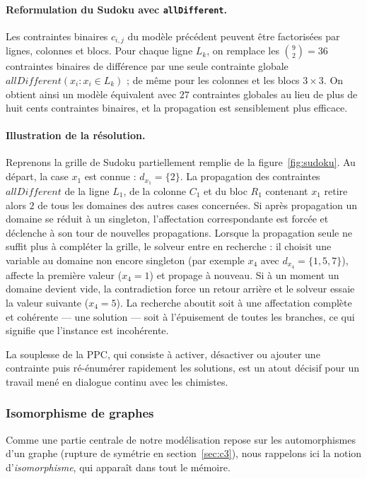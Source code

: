 \documentclass[11pt,a4paper]{article}
\begin{document}
\paragraph{Reformulation du Sudoku avec \texttt{allDifferent}.}
Les contraintes binaires $c_{i,j}$ du modèle précédent peuvent être
factorisées par lignes, colonnes et blocs. Pour chaque ligne $L_k$, on
remplace les $\binom{9}{2} = 36$ contraintes binaires de différence par
une seule contrainte globale $\mathit{allDifferent}(x_i : x_i \in L_k)$ ;
de même pour les colonnes et les blocs $3 \times 3$. On obtient ainsi
un modèle équivalent avec $27$ contraintes globales au lieu de plus de
huit cents contraintes binaires, et la propagation est sensiblement
plus efficace.

\paragraph{Illustration de la résolution.}
Reprenons la grille de Sudoku partiellement remplie de la
figure~\ref{fig:sudoku}. Au départ, la
case $x_1$ est connue : $d_{x_1} = \{2\}$. La propagation des
contraintes $\mathit{allDifferent}$ de la ligne $L_1$, de la colonne
$C_1$ et du bloc $R_1$ contenant $x_1$ retire alors $2$ de tous les
domaines des autres cases concernées. Si après propagation un domaine
se réduit à un singleton, l'affectation correspondante est forcée et
déclenche à son tour de nouvelles propagations. Lorsque la propagation
seule ne suffit plus à compléter la grille, le solveur entre en
recherche : il choisit une variable au domaine non encore singleton
(par exemple $x_4$ avec $d_{x_4} = \{1, 5, 7\}$), affecte la première
valeur ($x_4 = 1$) et propage à nouveau. Si à un moment un domaine
devient vide, la contradiction force un retour arrière et le solveur
essaie la valeur suivante ($x_4 = 5$). La recherche aboutit soit à
une affectation complète et cohérente — une solution — soit à
l'épuisement de toutes les branches, ce qui signifie que l'instance
est incohérente.

La souplesse de la PPC, qui consiste à activer, désactiver ou ajouter
une contrainte puis ré-énumérer rapidement les solutions, est un atout
décisif pour un travail mené en dialogue continu avec les chimistes.

\subsubsection{Isomorphisme de graphes}
\label{sec:ppc-isomorphisme}

Comme une partie centrale de notre modélisation repose sur les
automorphismes d'un graphe (rupture de symétrie en
section~\ref{sec:c3}), nous rappelons ici la notion
d'\emph{isomorphisme}, qui apparaît dans tout le mémoire.
\end{document}
